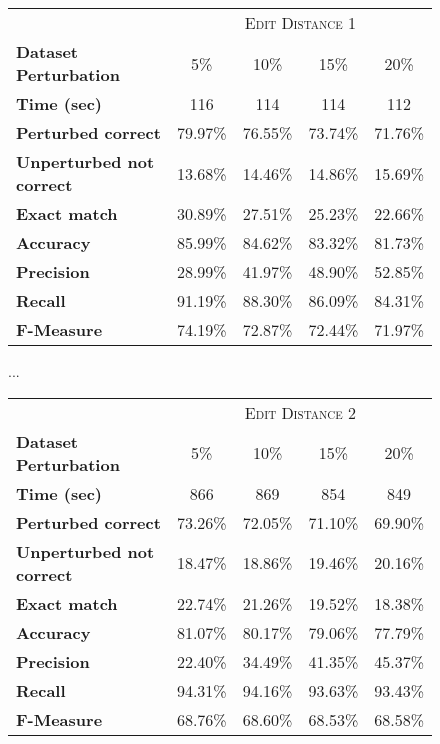 \begin{figure}[H]
	\centering
	\begin{tabular}{lcccc}
		\toprule
		&\multicolumn{4}{c}{\textsc{Edit Distance 1}} \\
		\textbf{Dataset Perturbation} & \num{5}\%& \num{10}\% & \num{15}\%& \num{20}\%  \\
		\midrule
		\textbf{Time (sec)}							 &\num{116}			&\num{114}			& \num{114}			&\num{112} \\
		\textbf{Perturbed correct} 			   & \num{79,97}\% &\num{76,55}\%  & \num{73,74}\%	& \num{71,76}\% \\
		\textbf{Unperturbed not correct} & \num{13,68}\% &\num{14,46}\%  & \num{14,86}\%	& \num{15,69}\% \\
		\textbf{Exact match} 					  & \num{30,89}\% &\num{27,51}\%  & \num{25,23}\%	& \num{22,66}\% \\
		\textbf{Accuracy} 							&\num{85,99}\%  &\num{84,62}\% &\num{83,32}\% &\num{81,73}\% \\
		\textbf{Precision}							 & \num{28,99}\% &\num{41,97}\%  & \num{48,90}\%	& \num{52,85}\% \\
		\textbf{Recall}								  & \num{91,19}\% &\num{88,30}\%  & \num{86,09}\%	& \num{84,31}\% \\
		\textbf{F-Measure}						  & \num{74,19}\% &\num{72,87}\%  & \num{72,44}\%	& \num{71,97}\% \\
		\bottomrule
	\end{tabular}
	\begin{center}
		...
	\end{center}
	\begin{tabular}{lcccc}
		\toprule
		&\multicolumn{4}{c}{\textsc{Edit Distance 2}} \\
		\textbf{Dataset Perturbation} & \num{5}\%& \num{10}\% & \num{15}\%& \num{20}\%  \\
		\midrule
		\textbf{Time (sec)}							 &\num{866}			&\num{869}			& \num{854}			&\num{849} \\
		\textbf{Perturbed correct} 			   & \num{73,26}\% &\num{72,05}\%  & \num{71,10}\%	& \num{69,90}\% \\
		\textbf{Unperturbed not correct} & \num{18,47}\% &\num{18,86}\%  & \num{19,46}\%	& \num{20,16}\% \\
		\textbf{Exact match} 					  & \num{22,74}\% &\num{21,26}\%  & \num{19,52}\%	& \num{18,38}\% \\
		\textbf{Accuracy} 							&\num{81,07}\%  &\num{80,17}\% &\num{79,06}\% &\num{77,79}\% \\
		\textbf{Precision}							 & \num{22,40}\% &\num{34,49}\%  & \num{41,35}\%	& \num{45,37}\% \\
		\textbf{Recall}								  & \num{94,31}\% &\num{94,16}\%  & \num{93,63}\%	& \num{93,43}\% \\
		\textbf{F-Measure}						  & \num{68,76}\% &\num{68,60}\%  & \num{68,53}\%	& \num{68,58}\% \\
		\bottomrule
	\end{tabular}
	
	\label{tab:sentence-eval3}
\end{figure}


